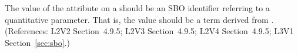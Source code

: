 The value of the  attribute on a \Parameter should be an SBO
identifier referring to a quantitative parameter.  That is, the value should
be a term derived from \sboparameter.  (References: L2V2 Section~4.9.5; L2V3
Section~4.9.5; L2V4 Section~4.9.5; L3V1 Section~\ref{sec:sbo}.)
